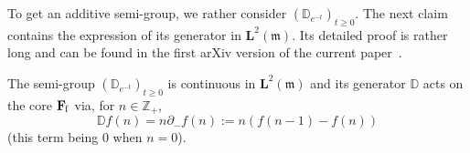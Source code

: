 \documentclass[AHL,Unicode,longabstracts]{cedram}
\newcommand{\df}{\mathrel{:=}}
\newcommand{\ZZ}{\mathbb{Z}}
\newcommand{\fm}{\mathfrak{m}}
\newcommand{\pa}{\partial}
\newcommand{\esL}{\mathbf{L}}
\newcommand{\esF}{\mathbf{F}}
\newcommand{\esFf}{\esF_{\hskip-.3mm\mathrm{f}}}
\newcommand{\discret}[1]{\mathds{#1}}
\begin{document}
To get an additive semi-group, we rather consider $(\discret{D}_{e^{-t}})_{t\geq 0}$. The next claim contains the expression of its generator in $\esL^2(\fm)$. Its detailed proof is rather long and can be found in the first arXiv version of the current paper~\cite{arxivversion}.

\begin{lemm}\label{appl2}
The semi-group $(\discret{D}_{e^{-t}})_{t\geq 0}$ is continuous in $\esL^2(\fm)$ and its generator $\discret{D}$ acts on the core $\esFf$ via, for $n\in \ZZ_+$,
\begin{equation}\label{dD}
\discret{D}f(n)= n\pa_-f(n)\df n (f(n-1)-f(n))
\end{equation}
(this term being 0 when $n=0$).
\end{lemm}




\end{document}

